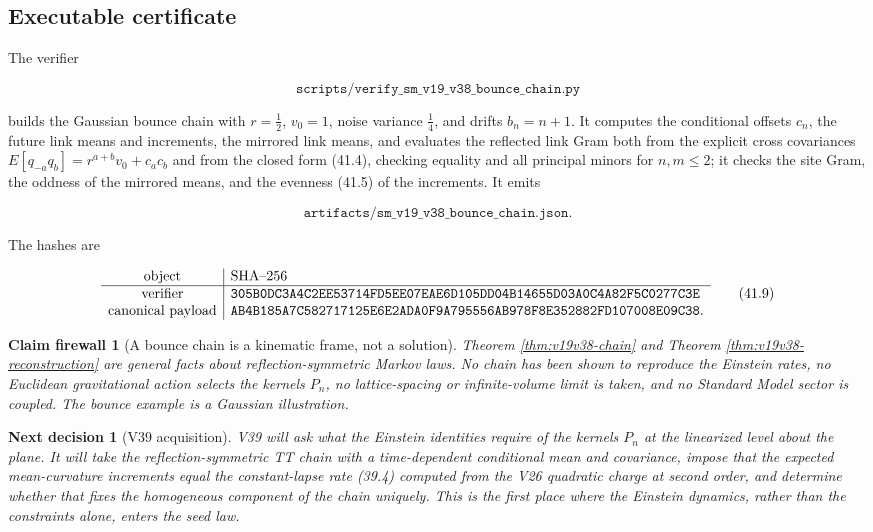 \documentclass[11pt]{article}
\newtheorem{firewall}[theorem]{Claim firewall}
\newtheorem{decision}[theorem]{Next decision}
\theoremstyle{remark}
\begin{document}
\subsection{Executable certificate}

The verifier

\[
 \texttt{scripts/verify\_sm\_v19\_v38\_bounce\_chain.py}           \tag{41.7}
\]

builds the Gaussian bounce chain with \(r=\tfrac12\), \(v_0=1\),
noise variance \(\tfrac14\), and drifts \(b_n=n+1\).  It computes the
conditional offsets \(c_n\), the future link means and increments, the
mirrored link means, and evaluates the reflected link Gram both from the
explicit cross covariances \(E[q_{-a}q_b]=r^{a+b}v_0+c_ac_b\) and from
the closed form (41.4), checking equality and all principal minors for
\(n,m\leq2\); it checks the site Gram, the oddness of the mirrored means,
and the evenness (41.5) of the increments.  It emits

\[
 \texttt{artifacts/sm\_v19\_v38\_bounce\_chain.json}.              \tag{41.8}
\]

The hashes are

\[
\begin{array}{c|l}
\hbox{object}&\hbox{SHA--256}\\ \hline
\hbox{verifier}&
\texttt{305B0DC3A4C2EE53714FD5EE07EAE6D105DD04B14655D03A0C4A82F5C0277C3E}\\
\hbox{canonical payload}&
\texttt{AB4B185A7C582717125E6E2ADA0F9A795556AB978F8E352882FD107008E09C38}.
\end{array}                                                     \tag{41.9}
\]

\begin{firewall}[A bounce chain is a kinematic frame, not a solution]
\label{fire:v19v38}
Theorem \ref{thm:v19v38-chain} and Theorem
\ref{thm:v19v38-reconstruction} are general facts about
reflection-symmetric Markov laws.  No chain has been shown to reproduce
the Einstein rates, no Euclidean gravitational action selects the
kernels \(P_n\), no lattice-spacing or infinite-volume limit is taken,
and no Standard Model sector is coupled.  The bounce example is a
Gaussian illustration.
\end{firewall}

\begin{decision}[V39 acquisition]
\label{dec:v19v38-next}
V39 will ask what the Einstein identities require of the kernels
\(P_n\) at the linearized level about the plane.  It will take the
reflection-symmetric TT chain with a time-dependent conditional mean
and covariance, impose that the expected mean-curvature increments equal
the constant-lapse rate (39.4) computed from the V26 quadratic charge
at second order, and determine whether that fixes the homogeneous
component of the chain uniquely.  This is the first place where the
Einstein dynamics, rather than the constraints alone, enters the seed
law.
\end{decision}
\end{document}
